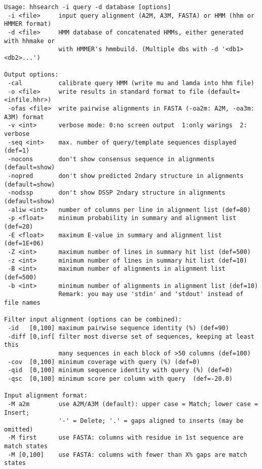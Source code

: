 \documentclass[11pt,a4paper]{article}
\begin{document}
\small \begin{verbatim}
Usage: hhsearch -i query -d database [options] 
 -i <file>     input query alignment (A2M, A3M, FASTA) or HMM (hhm or HMMER format)
 -d <file>     HMM database of concatenated HMMs, either generated with hhmake or
               with HMMER's hmmbuild. (Multiple dbs with -d '<db1> <db2>...')

Output options:                                                            
 -cal          calibrate query HMM (write mu and lamda into hhm file)         
 -o <file>     write results in standard format to file (default=<infile.hhr>)
 -ofas <file>  write pairwise alignments in FASTA (-oa2m: A2M, -oa3m: A3M) format
 -v <int>      verbose mode: 0:no screen output  1:only warings  2: verbose   
 -seq <int>    max. number of query/template sequences displayed (def=1) 
 -nocons       don't show consensus sequence in alignments (default=show)     
 -nopred       don't show predicted 2ndary structure in alignments (default=show)
 -nodssp       don't show DSSP 2ndary structure in alignments (default=show)  
 -aliw <int>   number of columns per line in alignment list (def=80)
 -p <float>    minimum probability in summary and alignment list (def=20)   
 -E <float>    maximum E-value in summary and alignment list (def=1E+06)       
 -Z <int>      maximum number of lines in summary hit list (def=500)         
 -z <int>      minimum number of lines in summary hit list (def=10)         
 -B <int>      maximum number of alignments in alignment list (def=500)      
 -b <int>      minimum number of alignments in alignment list (def=10)      
               Remark: you may use 'stdin' and 'stdout' instead of file names

Filter input alignment (options can be combined):                             
 -id   [0,100] maximum pairwise sequence identity (%) (def=90)   
 -diff [0,inf[ filter most diverse set of sequences, keeping at least this    
               many sequences in each block of >50 columns (def=100)
 -cov  [0,100] minimum coverage with query (%) (def=0) 
 -qid  [0,100] minimum sequence identity with query (%) (def=0) 
 -qsc  [0,100] minimum score per column with query  (def=-20.0)

Input alignment format:                                                       
 -M a2m        use A2M/A3M (default): upper case = Match; lower case = Insert;
               '-' = Delete; '.' = gaps aligned to inserts (may be omitted)   
 -M first      use FASTA: columns with residue in 1st sequence are match states
 -M [0,100]    use FASTA: columns with fewer than X% gaps are match states   


\end{verbatim}
\end{document}
